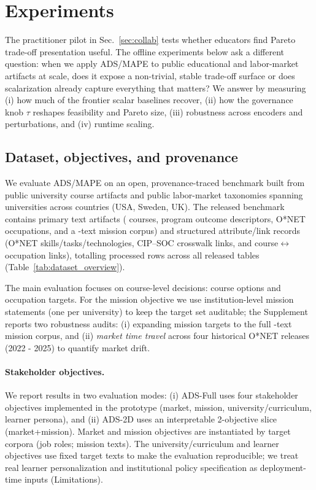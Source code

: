 \documentclass{article}
\newcommand{\ADS}{\textsc{ADS}\xspace}
\newcommand{\MAPE}{\textsc{MAPE}\xspace}
\begin{document}
\section{Experiments}

\label{sec:experiments}

The practitioner pilot in Sec.~\ref{sec:collab} tests whether educators find Pareto trade-off presentation useful. The offline experiments below ask a different question: when we apply \ADS/\MAPE to public educational and labor-market artifacts at scale, does it expose a non-trivial, stable trade-off surface or does scalarization already capture everything that matters? We answer by measuring (i) how much of the frontier scalar baselines recover, (ii) how the governance knob $\tau$ reshapes feasibility and Pareto size, (iii) robustness across encoders and perturbations, and (iv) runtime scaling.

\subsection{Dataset, objectives, and provenance}
\label{subsec:data}
We evaluate \ADS/\MAPE on an open, provenance-traced benchmark built from {public university course artifacts} and {public labor-market taxonomies} spanning {\NumUniversities} universities across {\NumCountries} countries (USA, Sweden, UK). The released benchmark contains {\NumPrimaryArtifacts} primary text artifacts ({\NumCourses} courses, {\NumPrograms} program outcome descriptors, {\NumOccupations} O*NET occupations, and a {\NumMissionsExpanded}-text mission corpus) and {\NumAttributeRecords} structured attribute/link records (O*NET skills/tasks/technologies, CIP--SOC crosswalk links, and course$\leftrightarrow$occupation links), totalling {\NumProcessedRows} processed rows across all released tables (Table~\ref{tab:dataset_overview}).

The {main evaluation} focuses on course-level decisions: \NumCourses course options and \NumOccupations occupation targets. For the mission objective we use {\NumMissionsMain} institution-level mission statements (one per university) to keep the target set auditable; the Supplement reports two robustness audits: (i) expanding mission targets to the full \NumMissionsExpanded-text mission corpus, and (ii) \emph{market time travel} across four historical O*NET releases (2022 - 2025) to quantify market drift.

\paragraph{Stakeholder objectives.}
We report results in two evaluation modes:
(i) {ADS-Full} uses four stakeholder objectives implemented in the prototype (market, mission, university/curriculum, learner persona), and
(ii) {ADS-2D} uses an interpretable 2-objective slice (market+mission).
Market and mission objectives are instantiated by target corpora (job roles; mission texts). The university/curriculum and learner objectives use fixed target texts to make the evaluation reproducible; we treat real learner personalization and institutional policy specification as deployment-time inputs (Limitations).
\end{document}

